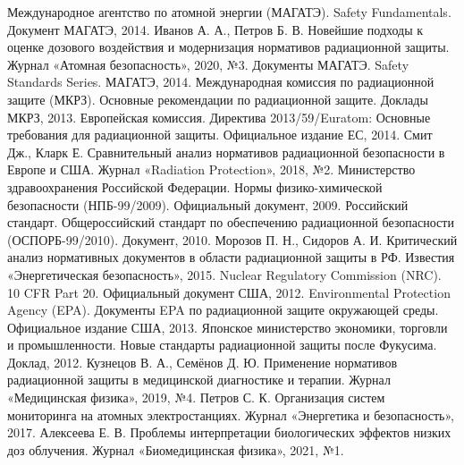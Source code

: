 \documentclass[a4paper, 14pt]{extarticle}
\begin{document}
\newpage
\begin{thebibliography}{99}
     Международное агентство по атомной энергии (МАГАТЭ). Safety Fundamentals. Документ МАГАТЭ, 2014.
     Иванов А. А., Петров Б. В. Новейшие подходы к оценке дозового воздействия и модернизация нормативов радиационной защиты. Журнал «Атомная безопасность», 2020, №3.
     Документы МАГАТЭ. Safety Standards Series. МАГАТЭ, 2014.
     Международная комиссия по радиационной защите (МКРЗ). Основные рекомендации по радиационной защите. Доклады МКРЗ, 2013.
     Европейская комиссия. Директива 2013/59/Euratom: Основные требования для радиационной защиты. Официальное издание ЕС, 2014.
     Смит Дж., Кларк Е. Сравнительный анализ нормативов радиационной безопасности в Европе и США. Журнал «Radiation Protection», 2018, №2.
     Министерство здравоохранения Российской Федерации. Нормы физико-химической безопасности (НПБ-99/2009). Официальный документ, 2009.
     Российский стандарт. Общероссийский стандарт по обеспечению радиационной безопасности (ОСПОРБ-99/2010). Документ, 2010.
     Морозов П. Н., Сидоров А. И. Критический анализ нормативных документов в области радиационной защиты в РФ. Известия «Энергетическая безопасность», 2015.
     Nuclear Regulatory Commission (NRC). 10 CFR Part 20. Официальный документ США, 2012.
     Environmental Protection Agency (EPA). Документы EPA по радиационной защите окружающей среды. Официальное издание США, 2013.
     Японское министерство экономики, торговли и промышленности. Новые стандарты радиационной защиты после Фукусима. Доклад, 2012.
     Кузнецов В. А., Семёнов Д. Ю. Применение нормативов радиационной защиты в медицинской диагностике и терапии. Журнал «Медицинская физика», 2019, №4.
     Петров С. К. Организация систем мониторинга на атомных электростанциях. Журнал «Энергетика и безопасность», 2017.
     Алексеева Е. В. Проблемы интерпретации биологических эффектов низких доз облучения. Журнал «Биомедицинская физика», 2021, №1.
\end{thebibliography}
\end{document}
